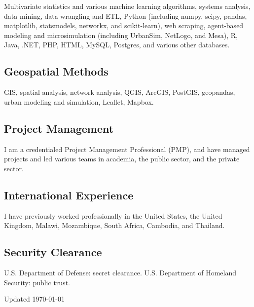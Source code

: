 \documentclass[12pt,letterpaper]{report}
\newcommand{\listitemspace}{0.2em}
\renewenvironment{itemize}{
  \begin{list}{}{
      \setlength{\leftmargin}{0em}
      \setlength{\parskip}{0em}
      \setlength{\itemsep}{\listitemspace}
      \setlength{\parsep}{\listitemspace}
    }
}{
  \end{list}
}
\begin{document}
\begin{itemize}
\item Multivariate statistics and various machine learning algorithms, systems analysis, data mining, data wrangling and ETL, Python (including numpy, scipy, pandas, matplotlib, statsmodels, networkx, and scikit-learn), web scraping, agent-based modeling and microsimulation (including UrbanSim, NetLogo, and Mesa), R, Java, .NET, PHP, HTML, MySQL, Postgres, and various other databases.
\end{itemize}

\subsection*{Geospatial Methods}

\begin{itemize}
\item GIS, spatial analysis, network analysis, QGIS, ArcGIS, PostGIS, geopandas, urban modeling and simulation, Leaflet, Mapbox.
\end{itemize}

\subsection*{Project Management}

\begin{itemize}
\item I am a credentialed Project Management Professional (PMP), and have managed projects and led various teams in academia, the public sector, and the private sector.
\end{itemize}

\subsection*{International Experience}

\begin{itemize}
\item I have previously worked professionally in the United States, the United Kingdom, Malawi, Mozambique, South Africa, Cambodia, and Thailand.
\end{itemize}

\subsection*{Security Clearance}

\begin{itemize}
\item U.S. Department of Defense: secret clearance. U.S. Department of Homeland Security: public trust.
\end{itemize}


\begin{center}
\vspace{6em}
Updated \monthyeardate\today
\end{center} 
\end{document}
